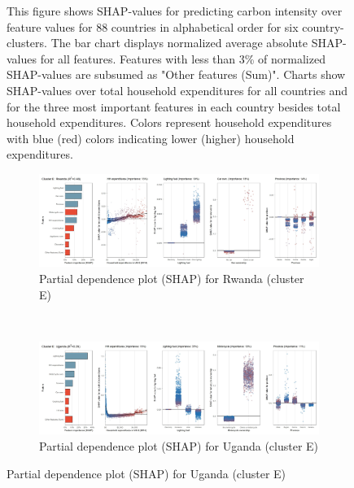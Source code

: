 \begin{figure}[ht!]
    \begin{subcaption2}
     This figure shows SHAP-values for predicting carbon intensity over feature values for 88 countries in alphabetical order for six country-clusters. The bar chart displays normalized average absolute SHAP-values for all features. Features with less than 3\% of normalized SHAP-values are subsumed as "Other features (Sum)". Charts show SHAP-values over total household expenditures for all countries and for the three most important features in each country besides total household expenditures. Colors represent household expenditures with blue (red) colors indicating lower (higher) household expenditures.
     \end{subcaption2}
\end{figure}


\begin{figure}[ht!]\ContinuedFloat
    \centering
   \begin{subfigure}[b]{\textwidth}
    \centering
         \caption{Partial dependence plot (SHAP) for Rwanda (cluster E)}
         \label{fig:5b_RWA}
         \includegraphics[width=\textwidth]{Figure 5b/Figure_5b_RWA}
         \end{subfigure}
    \\
    \vspace{0.5cm}
    \begin{subfigure}[b]{\textwidth}
     \centering
         \caption{Partial dependence plot (SHAP) for Uganda (cluster E)}
         \label{fig:5b_UGA}
         \includegraphics[width=\textwidth]{Figure 5b/Figure_5b_UGA}        
     \end{subfigure}

\end{figure}
